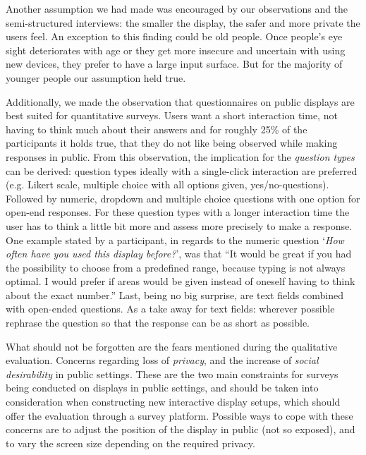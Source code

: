 	Another assumption we had made was encouraged by our observations and the semi-structured interviews: the smaller the display, the safer and more private the users feel. An exception to this finding could be old people. Once people's eye sight deteriorates with age or they get more insecure and uncertain with using new devices, they prefer to have a large input surface. But for the majority of younger people our assumption held true.

	Additionally, we made the observation that questionnaires on public displays are best suited for quantitative surveys. Users want a short interaction time, not having to think much about their answers and for roughly 25\% of the participants it holds true, that they do not like being observed while making responses in public.
	From this observation, the implication for the \textit{question types} can be derived: question types ideally with a single-click interaction are preferred (e.g. Likert scale, multiple choice with all options given, yes/no-questions). Followed by numeric, dropdown and multiple choice questions with one option for open-end responses. For these question types with a longer interaction time the user has to think a little bit more and assess more precisely to make a response. One example stated by a participant, in regards to the numeric question `\textit{How often have you used this display before?}', was that ``It would be great if you had the possibility to choose from a predefined range, because typing is not always optimal. I would prefer if areas would be given instead of oneself having to think about the exact number.'' Last, being no big surprise, are text fields combined with open-ended questions. As a take away for text fields: wherever possible rephrase the question so that the response can be as short as possible.


	What should not be forgotten are the fears mentioned during the qualitative evaluation. Concerns regarding loss of \textit{privacy}, and the increase of \textit{social desirability} in public settings. These are the two main constraints for surveys being conducted on displays in public settings, and should be taken into consideration when constructing new interactive display setups, which should offer the evaluation through a survey platform. Possible ways to cope with these concerns are to adjust the position of the display in public (not so exposed), and to vary the screen size depending on the required privacy.


